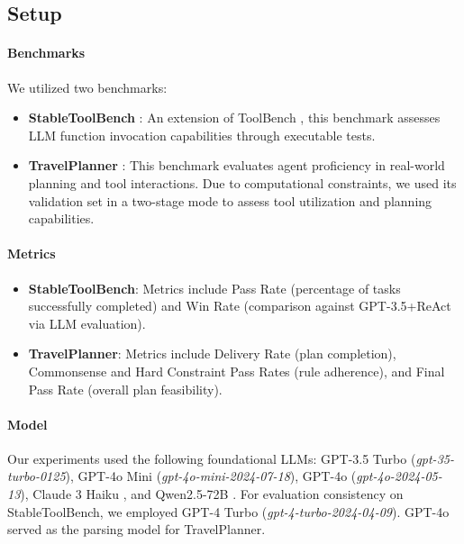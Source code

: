 \documentclass{article}
\begin{document}
\subsection{Setup}
\paragraph{Benchmarks}
We utilized two benchmarks:
\begin{itemize}
\item \textbf{StableToolBench} \cite{guo2024stabletoolbench}: An extension of ToolBench \cite{qin2023toolllm}, this benchmark assesses LLM function invocation capabilities through executable tests.
\item \textbf{TravelPlanner} \cite{xie2024travelplanner}: This benchmark evaluates agent proficiency in real-world planning and tool interactions. Due to computational constraints, we used its validation set in a two-stage mode to assess tool utilization and planning capabilities.
\end{itemize}


\paragraph{Metrics}
\begin{itemize}
\item \textbf{StableToolBench}: Metrics include Pass Rate (percentage of tasks successfully completed) and Win Rate (comparison against GPT-3.5+ReAct via LLM evaluation).
\item \textbf{TravelPlanner}: Metrics include Delivery Rate (plan completion), Commonsense and Hard Constraint Pass Rates (rule adherence), and Final Pass Rate (overall plan feasibility).
\end{itemize}


\paragraph{Model} Our experiments used the following foundational LLMs: GPT-3.5 Turbo \cite{ouyang2022training} (\textsl{gpt-35-turbo-0125}), GPT-4o Mini \cite{achiam2023gpt} (\textsl{gpt-4o-mini-2024-07-18}), GPT-4o \cite{achiam2023gpt} (\textsl{gpt-4o-2024-05-13}), Claude 3 Haiku \cite{anthropic_claude3}, and Qwen2.5-72B \cite{qwen2.5}. For evaluation consistency on StableToolBench, we employed GPT-4 Turbo \cite{achiam2023gpt} (\textsl{gpt-4-turbo-2024-04-09}). GPT-4o served as the parsing model for TravelPlanner.
\end{document}
